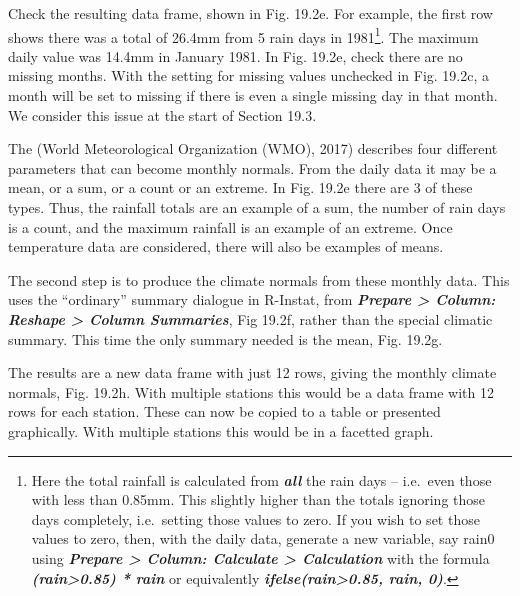 \documentclass[
  letterpaper,
  DIV=11,
  numbers=noendperiod]{scrreprt}
\begin{document}
Check the resulting data frame, shown in Fig. 19.2e. For example, the
first row shows there was a total of 26.4mm from 5 rain days in
1981\footnote{Here the total rainfall is calculated from
  \textbf{\emph{all}} the rain days -- i.e.~even those with less than
  0.85mm. This slightly higher than the totals ignoring those days
  completely, i.e.~setting those values to zero. If you wish to set
  those values to zero, then, with the daily data, generate a new
  variable, say rain0 using \textbf{\emph{Prepare \textgreater{} Column:
  Calculate \textgreater{} Calculation}} with the formula
  \textbf{\emph{(rain\textgreater0.85) * rain}} or equivalently
  \textbf{\emph{ifelse(rain\textgreater0.85, rain, 0)}}.}. The maximum
daily value was 14.4mm in January 1981. In Fig. 19.2e, check there are
no missing months. With the setting for missing values unchecked in Fig.
19.2c, a month will be set to missing if there is even a single missing
day in that month. We consider this issue at the start of Section 19.3.

The (World Meteorological Organization (WMO), 2017) describes four
different parameters that can become monthly normals. From the daily
data it may be a mean, or a sum, or a count or an extreme. In Fig. 19.2e
there are 3 of these types. Thus, the rainfall totals are an example of
a sum, the number of rain days is a count, and the maximum rainfall is
an example of an extreme. Once temperature data are considered, there
will also be examples of means.

The second step is to produce the climate normals from these monthly
data. This uses the ``ordinary'' summary dialogue in R-Instat, from
\textbf{\emph{Prepare \textgreater{} Column: Reshape \textgreater{}
Column Summaries}}, Fig 19.2f, rather than the special climatic summary.
This time the only summary needed is the mean, Fig. 19.2g.

The results are a new data frame with just 12 rows, giving the monthly
climate normals, Fig. 19.2h. With multiple stations this would be a data
frame with 12 rows for each station. These can now be copied to a table
or presented graphically. With multiple stations this would be in a
facetted graph.
\end{document}
